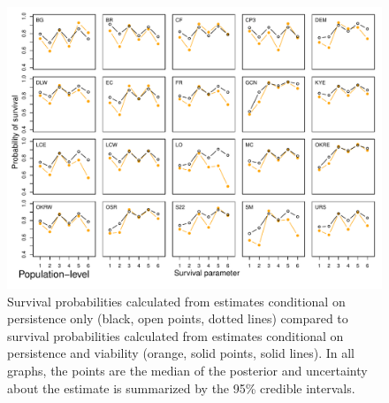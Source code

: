 \documentclass[12pt, oneside]{article}   	%
\begin{document}
 \begin{figure}[!h]
        \centering
        \includegraphics[page=2,width=\textwidth]{../../figures/compare-structured-survival2.pdf} 
            \caption{  Survival probabilities calculated from estimates conditional on persistence only (black, open points, dotted lines) compared to survival probabilities calculated from estimates conditional on persistence and viability (orange, solid points, solid lines). In all graphs, the points are the median of the posterior and uncertainty about the estimate is summarized by the 95\% credible intervals.  }
 \label{fig:germination-estimates-population}
\end{figure}

\end{document}
